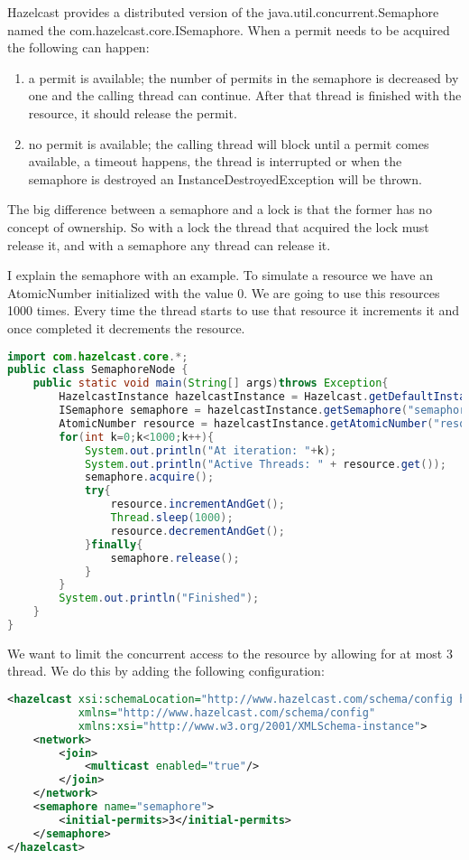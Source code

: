 Hazelcast provides a distributed version of the java.util.concurrent.Semaphore named the com.hazelcast.core.ISemaphore. When a permit needs to be acquired the following can happen:
\begin{enumerate}
\item a permit is available; the number of permits in the semaphore is decreased by one and the calling thread can continue. After that thread is finished with the resource, it should release the permit.
\item no permit is available; the calling thread will block until a permit comes available, a timeout happens, the thread is interrupted or when the semaphore is destroyed an InstanceDestroyedException will be thrown.
\end{enumerate}

The big difference between a semaphore and a lock is that the former has no concept of ownership. So with a lock the thread that acquired the lock must release it, and with a semaphore any thread can release it. 

I explain the semaphore with an example. To simulate a resource we have an AtomicNumber initialized with the value 0. We are going to use this resources 1000 times. Every time the thread starts to use that resource it increments it and once completed it decrements the resource.
\begin{lstlisting}[language=java]
import com.hazelcast.core.*;
public class SemaphoreNode {
    public static void main(String[] args)throws Exception{
        HazelcastInstance hazelcastInstance = Hazelcast.getDefaultInstance();
        ISemaphore semaphore = hazelcastInstance.getSemaphore("semaphore");
        AtomicNumber resource = hazelcastInstance.getAtomicNumber("resource");
        for(int k=0;k<1000;k++){
            System.out.println("At iteration: "+k);
            System.out.println("Active Threads: " + resource.get());
            semaphore.acquire();
            try{
                resource.incrementAndGet();
                Thread.sleep(1000);
                resource.decrementAndGet();
            }finally{
                semaphore.release();
            }
        }
        System.out.println("Finished");
    }
}
\end{lstlisting}

We want to limit the concurrent access to the resource by allowing for at most 3 thread. We do this by adding the following configuration:

\begin{lstlisting}[language=xml]
<hazelcast xsi:schemaLocation="http://www.hazelcast.com/schema/config hazelcast-config-2.3.xsd"
           xmlns="http://www.hazelcast.com/schema/config"
           xmlns:xsi="http://www.w3.org/2001/XMLSchema-instance">
    <network>
        <join>
            <multicast enabled="true"/>
        </join>
    </network>
    <semaphore name="semaphore">
        <initial-permits>3</initial-permits>
    </semaphore>
</hazelcast>
\end{lstlisting}

